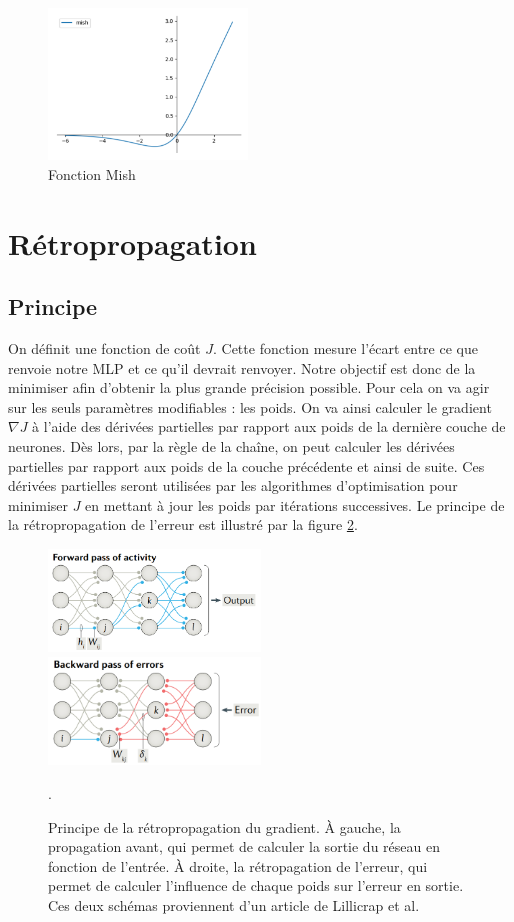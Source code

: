 \begin{figure}[!h]
\centering
\includegraphics[width=150pt]{"images/MLP/mish2"}
\caption{Fonction Mish}
\label{Mish}
\end{figure}


\section{Rétropropagation}
\subsection{Principe}

On définit une fonction de coût $J$. Cette fonction mesure l'écart entre ce que renvoie notre MLP et ce qu'il devrait renvoyer. Notre objectif est donc de la minimiser afin d'obtenir la plus grande précision possible. Pour cela on va agir sur les seuls paramètres modifiables : les poids. On va ainsi calculer le gradient $\nabla J$ à l'aide des dérivées partielles par rapport aux poids de la dernière couche de neurones. Dès lors, par la règle de la chaîne, on peut calculer les dérivées partielles par rapport aux poids de la couche précédente et ainsi de suite. Ces dérivées partielles seront utilisées par les algorithmes d'optimisation pour minimiser $J$ en mettant à jour les poids par itérations successives. Le principe de la rétropropagation de l'erreur est illustré par la figure \ref{backward}.

\begin{figure}[!h]
\centering
\includegraphics[width=160pt]{"images/MLP/forward"}
\hspace*{5mm}
\includegraphics[width=160pt]{"images/MLP/backward"}
\caption{Principe de la rétropropagation du gradient. À gauche, la propagation avant, qui permet de calculer la sortie du réseau en fonction de l'entrée. À droite, la rétropagation de l'erreur, qui permet de calculer l'influence de chaque poids sur l'erreur en sortie. Ces deux schémas proviennent d'un article de Lillicrap et al. \cite{lillicrap_backpropagation_2020}}.
\label{backward}
\end{figure}

